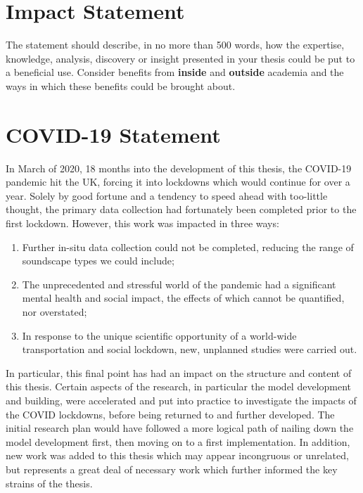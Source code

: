 \documentclass[twoside,fontsize=12pt,titlepage,chapterprefix=true
]{scrbook}
\begin{document}

\chapter*{Impact Statement}
The statement should describe, in no more than 500 words, how the expertise, knowledge, analysis, discovery or insight presented in your thesis could be put to a beneficial use. Consider benefits from \textbf{inside} and \textbf{outside} academia and the ways in which these benefits could be brought about.

\chapter*{COVID-19 Statement}

In March of 2020, 18 months into the development of this thesis, the COVID-19 pandemic hit the UK, forcing it into lockdowns which would continue for over a year. Solely by good fortune and a tendency to speed ahead with too-little thought, the primary data collection had fortunately been completed prior to the first lockdown. However, this work was impacted in three ways:

\begin{enumerate}
      \item Further in-situ data collection could not be completed, reducing the range of soundscape types we could include;
      \item The unprecedented and stressful world of the pandemic had a significant mental health and social impact, the effects of which cannot be quantified, nor overstated;
      \item In response to the unique scientific opportunity of a world-wide transportation and social lockdown, new, unplanned studies were carried out.
\end{enumerate}

In particular, this final point has had an impact on the structure and content of this thesis. Certain aspects of the research, in particular the model development and building, were accelerated and put into practice to investigate the impacts of the COVID lockdowns, before being returned to and further developed. The initial research plan would have followed a more logical path of nailing down the model development first, then moving on to a first implementation. In addition, new work was added to this thesis which may appear incongruous or unrelated, but represents a great deal of necessary work which further informed the key strains of the thesis.
\end{document}
